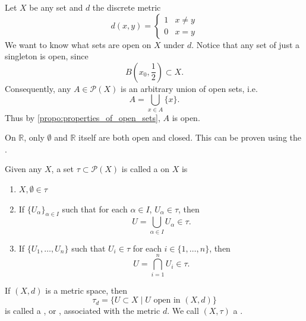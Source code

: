 \documentclass[notoc,notitlepage]{tufte-book}
\begin{document}
\begin{eg}
  Let $X$ be any set and $d$ the discrete metric
  \begin{equation*}
    d(x, y) = \begin{cases}
      1 & x \neq y \\
      0 & x = y
    \end{cases}
  \end{equation*}
  We want to know what sets are open on $X$ under $d$. Notice that any set of just a singleton is open, since
  \begin{equation*}
    B\left(x_0, \frac{1}{2}\right) \subset X.
  \end{equation*}
  Consequently, any $A \in \mathcal{P}(X)$ is an arbitrary union of open sets, i.e.
  \begin{equation*}
    A = \bigcup_{x \in A} \{ x \}.
  \end{equation*}
  Thus by \cref{propo:properties_of_open_sets}, $A$ is open.
\end{eg}

\begin{note}
  On $\mathbb{R}$, only $\emptyset$ and $\mathbb{R}$ itself are both open and closed. This can be proven using the .
\end{note}

\begin{defn}[Topology]\label{defn:topology}
  Given any $X$, a set $\tau \subset \mathcal{P}(X)$ is called a  on $X$ is
  \begin{enumerate}
    \item $X, \emptyset \in \tau$
    \item If $\{ U_\alpha \}_{\alpha \in I}$ such that for each $\alpha \in I$, $U_\alpha \in \tau$, then
      \begin{equation*}
        U = \bigcup_{\alpha \in I} U_\alpha \in \tau.
      \end{equation*}
    \item If $\{ U_1, \ldots, U_n \}$ such that $U_i \in \tau$ for each $i \in \{1, \ldots, n\}$, then
      \begin{equation*}
        U = \bigcap_{i = 1}^{n} U_i \in \tau.
      \end{equation*}
  \end{enumerate}
  If $(X, d)$ is a metric space, then
  \begin{equation*}
    \tau_d = \{ U \subset X \mid U \text{ open in } (X, d) \}
  \end{equation*}
  is called a , or , associated with the metric $d$. We call $(X, \tau)$ a .
\end{defn}
\end{document}
